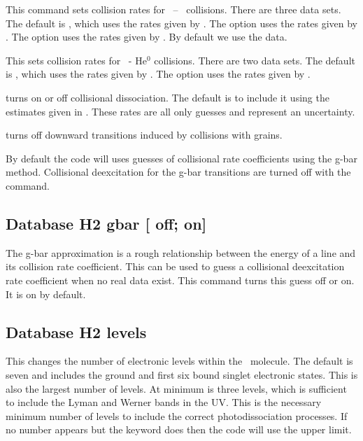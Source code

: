 
This command sets collision rates for \htwo\ -- \hO\ collisions.
There are three data sets.
The default is , which uses the rates given by \citet{Wrathmall2007}.
The  option uses the rates given by \citet{LeBourlot1999}.   
The  option uses the rates given by \citet{2015MNRAS.453..810L}.
By default we use the \citet{Wrathmall2007} data.


This sets collision rates for \htwo\ - He$^0$ collisions.
There are two data sets.
The default is , which uses the rates given by \citet{LeeH2He2006}.
The  option uses the rates given by \citet{LeBourlot1999}.

turns on or off collisional dissociation.
The default is to include it using the estimates given in
\citet{Shaw2005}.
These rates are all only guesses and represent an
uncertainty.

 turns off downward
transitions induced by collisions with grains.

By default the code will uses guesses of collisional rate coefficients
using the g-bar method.
Collisional deexcitation for the g-bar transitions
are turned off with the  command.

\subsection{Database H2 gbar [ off; on]}

The g-bar approximation is a rough relationship between the energy of
a line and its collision rate coefficient.  This can be used to guess a
collisional deexcitation rate coefficient when no real data exist.
This command turns this guess off or on.  It is on by default.

\subsection{Database H2 levels }

This changes the number of electronic levels within the \htwo\ molecule.
The default is seven and includes the ground and first six bound singlet
electronic states.
This is also the largest number of levels.  At minimum
is three levels, which is sufficient to include the Lyman and Werner bands
in the UV.
This is the necessary minimum number of levels to include the
correct photodissociation processes.
If no number appears but the keyword
 does then the code will use the upper limit.

